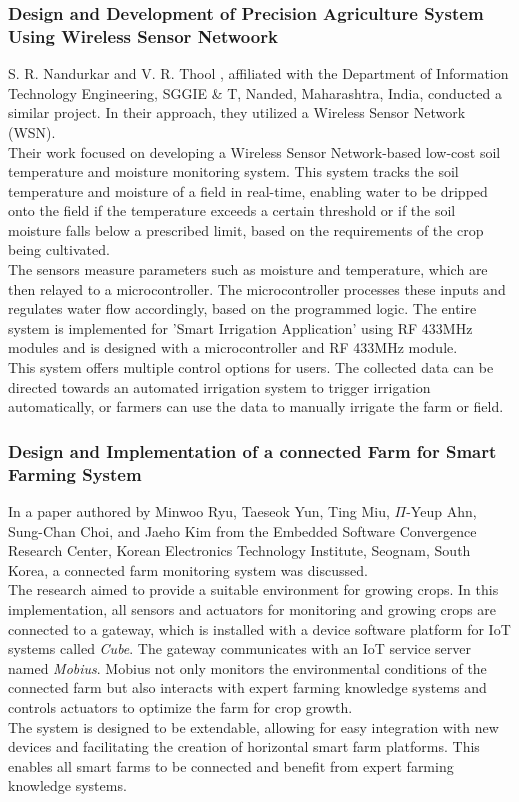 \documentclass[12pt, a4paper]{article}
\begin{document}
\subsubsection{Design and Development of Precision Agriculture System Using Wireless Sensor Netwoork}
S. R. Nandurkar and V. R. Thool \cite{6808017}, affiliated with the Department of Information Technology Engineering, SGGIE \& T, Nanded, Maharashtra, India, conducted a similar project. In their approach, they utilized a Wireless Sensor Network (WSN).\\
Their work focused on developing a Wireless Sensor Network-based low-cost soil temperature and moisture monitoring system. This system tracks the soil temperature and moisture of a field in real-time, enabling water to be dripped onto the field if the temperature exceeds a certain threshold or if the soil moisture falls below a prescribed limit, based on the requirements of the crop being cultivated.\\
The sensors measure parameters such as moisture and temperature, which are then relayed to a microcontroller. The microcontroller processes these inputs and regulates water flow accordingly, based on the programmed logic. The entire system is implemented for 'Smart Irrigation Application' using RF 433MHz modules and is designed with a microcontroller and RF 433MHz module.\\
This system offers multiple control options for users. The collected data can be directed towards an automated irrigation system to trigger irrigation automatically, or farmers can use the data to manually irrigate the farm or field.

\subsubsection{Design and Implementation of a connected Farm for Smart Farming System}
In a paper authored by Minwoo Ryu, Taeseok Yun, Ting Miu, $\Pi$-Yeup Ahn, Sung-Chan Choi, and Jaeho Kim \cite{7370624} from the Embedded Software Convergence Research Center, Korean Electronics Technology Institute, Seognam, South Korea, a connected farm monitoring system was discussed.\\
The research aimed to provide a suitable environment for growing crops. In this implementation, all sensors and actuators for monitoring and growing crops are connected to a gateway, which is installed with a device software platform for IoT systems called \emph{Cube}. The gateway communicates with an IoT service server named \emph{Mobius}. Mobius not only monitors the environmental conditions of the connected farm but also interacts with expert farming knowledge systems and controls actuators to optimize the farm for crop growth.\\
The system is designed to be extendable, allowing for easy integration with new devices and facilitating the creation of horizontal smart farm platforms. This enables all smart farms to be connected and benefit from expert farming knowledge systems.    
  
\end{document}
